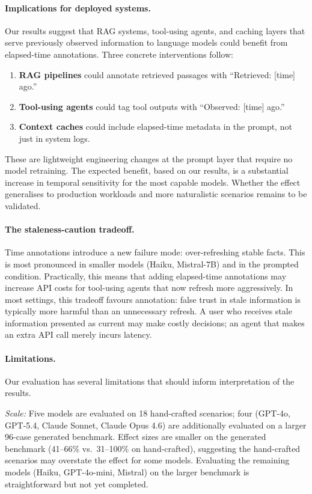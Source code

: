 \documentclass[11pt,a4paper]{article}
\begin{document}
\paragraph{Implications for deployed systems.}
Our results suggest that RAG systems, tool-using agents, and caching layers that serve previously observed information to language models could benefit from elapsed-time annotations.
Three concrete interventions follow:
\begin{enumerate}
    \item \textbf{RAG pipelines} could annotate retrieved passages with ``Retrieved: [time] ago.''
    \item \textbf{Tool-using agents} could tag tool outputs with ``Observed: [time] ago.''
    \item \textbf{Context caches} could include elapsed-time metadata in the prompt, not just in system logs.
\end{enumerate}
These are lightweight engineering changes at the prompt layer that require no model retraining.
The expected benefit, based on our results, is a substantial increase in temporal sensitivity for the most capable models.
Whether the effect generalises to production workloads and more naturalistic scenarios remains to be validated.

\paragraph{The staleness-caution tradeoff.}
Time annotations introduce a new failure mode: over-refreshing stable facts.
This is most pronounced in smaller models (Haiku, Mistral-7B) and in the prompted condition.
Practically, this means that adding elapsed-time annotations may increase API costs for tool-using agents that now refresh more aggressively.
In most settings, this tradeoff favours annotation: false trust in stale information is typically more harmful than an unnecessary refresh.
A user who receives stale information presented as current may make costly decisions; an agent that makes an extra API call merely incurs latency.

\paragraph{Limitations.}
Our evaluation has several limitations that should inform interpretation of the results.

\emph{Scale:} Five models are evaluated on 18 hand-crafted scenarios; four (GPT-4o, GPT-5.4, Claude Sonnet, Claude Opus 4.6) are additionally evaluated on a larger 96-case generated benchmark.
Effect sizes are smaller on the generated benchmark (41--66\% vs.\ 31--100\% on hand-crafted), suggesting the hand-crafted scenarios may overstate the effect for some models.
Evaluating the remaining models (Haiku, GPT-4o-mini, Mistral) on the larger benchmark is straightforward but not yet completed.
\end{document}
